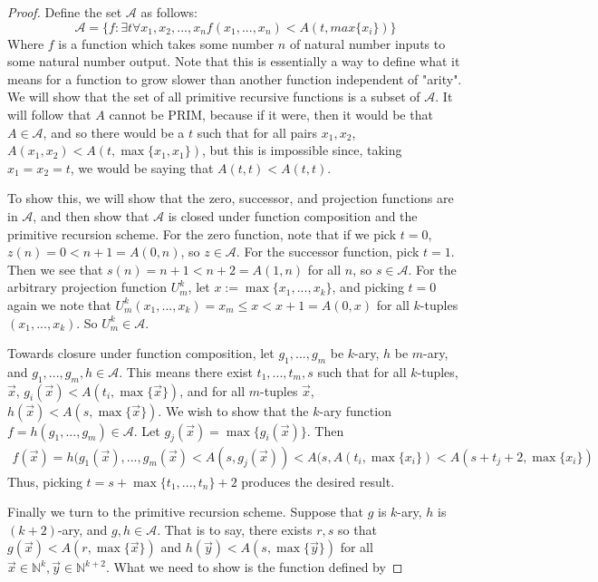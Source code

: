 \begin{proof}
    Define the set $\mathcal{A}$ as follows:
    \[ \mathcal{A} = \{f: \exists t \forall x_1,x_2,...,x_n f(x_1,...,x_n) < A(t,max\{x_i\})\} \]
    Where $f$ is a function which takes some number $n$ of natural number inputs to some natural number output. Note that this is essentially a way to define what it means for a function to grow slower than another function independent of "arity". We will show that the set of all primitive recursive functions is a subset of $\mathcal{A}$. It will follow that $A$ cannot be PRIM, because if it were, then it would be that $A \in \mathcal{A}$, and so there would be a $t$ such that for all pairs $x_1,x_2$, $A(x_1,x_2) < A(t,\max\{x_1,x_1\})$, but this is impossible since, taking $x_1=x_2=t$, we would be saying that $A(t,t)<A(t,t)$.
    \par To show this, we will show that the zero, successor, and projection functions are in $\mathcal{A}$, and then show that $\mathcal{A}$ is closed under function composition and the primitive recursion scheme. For the zero function, note that if we pick $t=0$, $z(n) = 0 < n+1 = A(0,n)$, so $z \in \mathcal{A}$. For the successor function, pick $t=1$. Then we see that $s(n) = n+1 < n+2 = A(1,n)$ for all $n$, so $s \in \mathcal{A}$. For the arbitrary projection function $U_m^k$, let $x := \max\{x_1,...,x_k\}$, and picking $t=0$ again we note that $U_m^k(x_1,...,x_k) = x_m \leq x < x+1 = A(0,x)$ for all $k$-tuples  $(x_1,...,x_k)$. So $U_m^k \in \mathcal{A}$.
    \par Towards closure under function composition, let $g_1,...,g_m$ be $k$-ary, $h$ be $m$-ary, and $g_1,...,g_m,h \in \mathcal{A}$. This means there exist $t_1,...,t_m,s$ such that for all $k$-tuples, $\vec{x}$, $g_i(\vec{x}) < A(t_i,\max\{\vec{x}\})$, and for all $m$-tuples $\vec{x}$, $h(\vec{x}) < A(s,\max\{\vec{x}\})$. We wish to show that the $k$-ary function $f = h(g_1,...,g_m) \in \mathcal{A}$. Let $g_j(\vec{x}) = \max\{g_i(\vec{x})\}$. Then
    \begin{align}
        f(\vec{x}) = h(g_1(\vec{x}),...,g_m(\vec{x}) < A(s,g_j(\vec{x})) < A(s,A(t_i,\max\{x_i\}) < A(s+t_j+2,\max\{x_i\})
    \end{align}
    Thus, picking $t = s+\max\{t_1,...,t_n\}+2$ produces the desired result.
    \par Finally we turn to the primitive recursion scheme. Suppose that $g$ is $k$-ary, $h$ is $(k+2)$-ary, and $g,h \in \mathcal{A}$. That is to say, there exists $r,s$ so that $g(\vec{x}) < A(r,\max\{\vec{x}\})$ and $h(\vec{y}) < A(s,\max\{\vec{y}\})$ for all $\vec{x} \in \mathbb{N}^k,\vec{y} \in \mathbb{N}^{k+2}$. What we need to show is the function defined by 

\end{proof}
